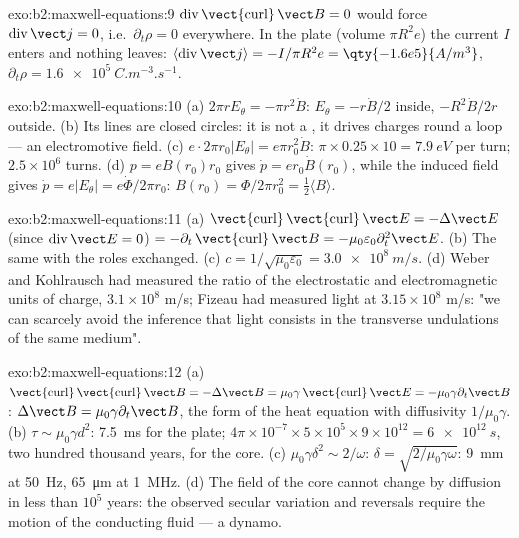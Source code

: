 \begin{solution}{exo:b2:maxwell-equations:9}
$\operatorname{div}\operatorname{\vect{curl}}\vect B = 0$ would force $\operatorname{div}\vect j =
0$, i.e.\ $\partial_t\rho = 0$ everywhere. In the plate (volume $\pi R^2e$) the
current $I$ enters and nothing leaves: $\langle\operatorname{div}\vect j\rangle =
-I/\pi R^2e = \qty{-1.6e5}{A/m^3}$, $\partial_t\rho = \qty{+1.6e5}{C.m^{-3}.s^{-1}}$.
\end{solution}

\begin{solution}{exo:b2:maxwell-equations:10}
(a) $2\pi rE_\theta = -\pi r^2\dot B$: $E_\theta = -r\dot B/2$ inside, $-R^2\dot B/2r$
outside. (b) Its lines are closed circles: it is not a , it
drives charges round a loop --- an electromotive field. (c) $e\cdot2\pi r_0
|E_\theta| = e\pi r_0^2\dot B$: $\pi \times 0.25 \times 10 = \qty{7.9}{eV}$ per turn; $2.5 \times 10^6$
turns. (d) $p = eB(r_0)r_0$ gives $\dot p = er_0\dot B(r_0)$, while the induced
field gives $\dot p = e|E_\theta| = e\dot\Phi/2\pi r_0$: $B(r_0) = \Phi/2\pi r_0^2 =
\tfrac12\langle B\rangle$.
\end{solution}

\begin{solution}{exo:b2:maxwell-equations:11}
(a) $\operatorname{\vect{curl}}\operatorname{\vect{curl}}\vect E = -\Delta\vect E$ (since $\operatorname{div}
\vect E = 0$) $= -\partial_t\operatorname{\vect{curl}}\vect B = -\mu_0\varepsilon_0\partial_t^2\vect E$. (b)
The same with the roles exchanged. (c) $c = 1/\sqrt{\mu_0\varepsilon_0} = \qty{3.0e8}{m/s}$.
(d) Weber and Kohlrausch had measured the ratio of the electrostatic
and electromagnetic units of charge, $3.1 \times 10^8$ m/s; Fizeau had
measured light at $3.15 \times 10^8$ m/s: "we can scarcely avoid the
inference that light consists in the transverse undulations of the
same medium".
\end{solution}

\begin{solution}{exo:b2:maxwell-equations:12}
(a) $\operatorname{\vect{curl}}\operatorname{\vect{curl}}\vect B = -\Delta\vect B = \mu_0\gamma\operatorname{\vect{curl}}
\vect E = -\mu_0\gamma\partial_t\vect B$: $\Delta\vect B = \mu_0\gamma\partial_t\vect B$, the form of the
heat equation with diffusivity $1/\mu_0\gamma$. (b) $\tau \sim \mu_0\gamma d^2$: \qty{7.5}{ms}
for the plate; $4\pi \times 10^{-7} \times 5 \times 10^5 \times 9 \times 10^{12} = \qty{6e12}{s}$, two hundred
thousand years, for the core. (c) $\mu_0\gamma\delta^2 \sim 2/\omega$: $\delta = \sqrt{2/\mu_0
\gamma\omega}$: \qty{9}{mm} at \qty{50}{Hz}, \qty{65}{\micro m} at \qty{1}{MHz}. (d) The field
of the core cannot change by diffusion in less than $10^5$ years: the
observed secular variation and reversals require the motion of the
conducting fluid --- a dynamo.
\end{solution}

